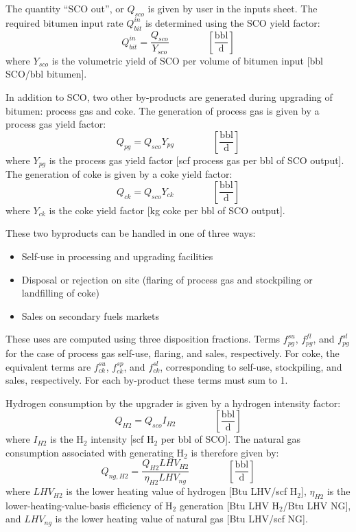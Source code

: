 \documentclass[11pt]{report}
\newcommand{\eqnunitfrac}[2]{\quad\quad \scriptstyle{\left[\frac{\text{#1}}{\text{#2}}\right]}}
\begin{document}
The quantity ``SCO out'', or $Q_{sco}$ is given by user in the inputs sheet.  The required bitumen input rate $Q_{bit}^{in}$ is determined using the SCO yield factor:
\begin{equation}
Q_{bit}^{in} = \frac{Q_{sco}}{Y_{sco}} \quad\quad\eqnunitfrac{bbl}{d}
\end{equation}
where $Y_{sco}$ is the volumetric yield of SCO per volume of bitumen input [bbl SCO/bbl bitumen].

In addition to SCO, two other by-products are generated during upgrading of bitumen: process gas and coke.  The generation of process gas is given by a process gas yield factor:
\begin{equation}
Q_{pg} = Q_{sco}Y_{pg} \quad\quad\eqnunitfrac{bbl}{d}
\end{equation}
where $Y_{pg}$ is the process gas yield factor [scf process gas per bbl of SCO output]. The generation of coke is given by a coke yield factor:
\begin{equation}
Q_{ck} = Q_{sco}Y_{ck} \quad\quad\eqnunitfrac{bbl}{d}
\end{equation}
where $Y_{ck}$ is the coke yield factor [kg coke per bbl of SCO output]. 

These two byproducts can be handled in one of three ways:
\begin{itemize}
\item Self-use in processing and upgrading facilities
\item Disposal or rejection on site (flaring of process gas and stockpiling or landfilling of coke)
\item Sales on secondary fuels markets
\end{itemize}

These uses are computed using three disposition fractions. Terms $f_{pg}^{su}$, $f_{pg}^{fl}$, and $f_{pg}^{sl}$ for the case of process gas self-use, flaring, and sales, respectively. For coke, the equivalent terms are $f_{ck}^{su}$, $f_{ck}^{sp}$, and $f_{ck}^{sl}$, corresponding to self-use, stockpiling, and sales, respectively. For each by-product these terms must sum to 1.  

Hydrogen consumption by the upgrader is given by a hydrogen intensity factor:
\begin{equation}
Q_{H2} = Q_{sco}I_{H2} \quad\quad\eqnunitfrac{bbl}{d}
\end{equation}
where $I_{H2}$ is the H$_2$ intensity [scf H$_2$ per bbl of SCO].  The natural gas consumption associated with generating H$_2$ is therefore given by:
\begin{equation}
Q_{ng,H2} = \frac{Q_{H2} LHV_{H2}}{\eta_{H2} LHV_{ng}}\quad\quad\eqnunitfrac{bbl}{d}
\end{equation}
where $LHV_{H2}$ is the lower heating value of hydrogen [Btu LHV/scf H$_2$], $\eta_{H2}$ is the lower-heating-value-basis efficiency of H$_2$ generation [Btu LHV H$_2$/Btu LHV NG], and $LHV_{ng}$ is the lower heating value of natural gas [Btu LHV/scf NG].
\end{document}

